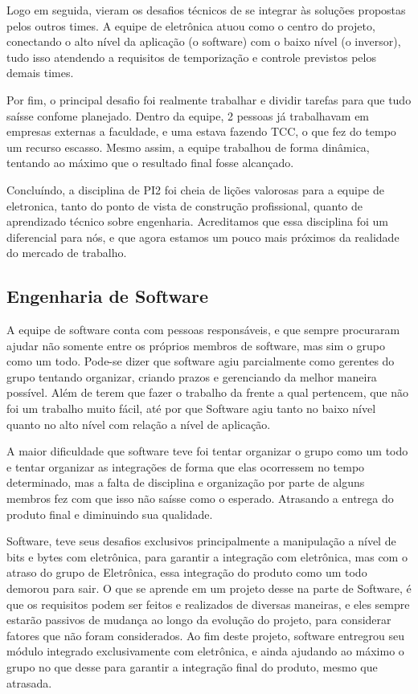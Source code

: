 Logo em seguida, vieram os desafios técnicos de se integrar às soluções propostas pelos outros times. A equipe de eletrônica atuou como o centro do projeto, conectando o alto nível da aplicação (o software) com o baixo nível (o inversor), tudo isso atendendo a requisitos de temporização e controle previstos pelos demais times.

Por fim, o principal desafio foi realmente trabalhar e dividir tarefas para que tudo saísse confome planejado. Dentro da equipe, 2 pessoas já trabalhavam em empresas externas a faculdade, e uma estava fazendo TCC, o que fez do tempo um recurso escasso. Mesmo assim, a equipe trabalhou de forma dinâmica, tentando ao máximo que o resultado final fosse alcançado.

Concluíndo, a disciplina de PI2 foi cheia de lições valorosas para a equipe de eletronica, tanto do ponto de vista de construção profissional, quanto de aprendizado técnico sobre engenharia. Acreditamos que essa disciplina foi um diferencial para nós, e que agora  estamos um pouco mais próximos da realidade do mercado de trabalho.

\subsection*{Engenharia de Software}
%
A equipe de software conta com pessoas responsáveis, e que sempre procuraram ajudar não somente entre os próprios membros de software, mas sim o grupo como um todo. Pode-se dizer que software agiu parcialmente como gerentes do grupo tentando organizar, criando prazos e gerenciando da melhor maneira possível. Além de terem que fazer o trabalho da frente a qual pertencem, que não foi um trabalho muito fácil, até por que Software agiu tanto no baixo nível quanto no alto nível com relação a nível de aplicação.

A maior dificuldade que software teve foi tentar organizar o grupo como um todo e tentar organizar as integrações de forma que elas ocorressem no tempo determinado, mas a falta de disciplina e organização por parte de alguns membros fez com que isso não saísse como o esperado. Atrasando a entrega do produto final e diminuindo sua qualidade.

Software, teve seus desafios exclusivos principalmente a manipulação a nível de bits e bytes com eletrônica, para garantir a integração com eletrônica, mas com o atraso do grupo de Eletrônica, essa integração do produto como um todo demorou para sair. O que se aprende em um projeto desse na parte de Software, é que os requisitos podem ser feitos e realizados de diversas maneiras, e eles sempre estarão passivos de mudança ao longo da evolução do projeto, para considerar fatores que não foram considerados. Ao fim deste projeto, software entregrou seu módulo integrado exclusivamente com eletrônica, e ainda ajudando ao máximo o grupo no que desse para garantir a integração final do produto, mesmo que atrasada.